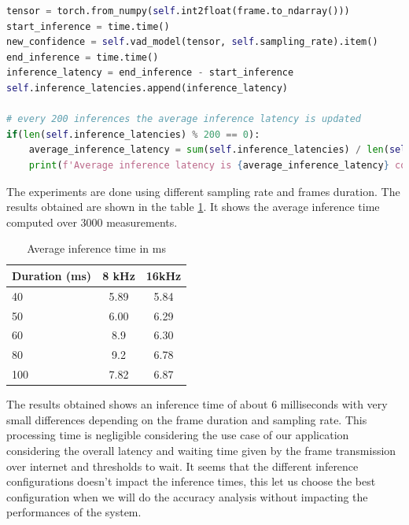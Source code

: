 \documentclass[../main.tex]{subfiles}
\begin{document}
\begin{lstlisting}[language=Python, caption={Model's inference latency}]
tensor = torch.from_numpy(self.int2float(frame.to_ndarray()))
start_inference = time.time()
new_confidence = self.vad_model(tensor, self.sampling_rate).item()
end_inference = time.time()
inference_latency = end_inference - start_inference
self.inference_latencies.append(inference_latency)
            
# every 200 inferences the average inference latency is updated
if(len(self.inference_latencies) % 200 == 0):
    average_inference_latency = sum(self.inference_latencies) / len(self.inference_latencies)
    print(f'Average inference latency is {average_inference_latency} computed over {len(self.inference_latencies)} measurements')
\end{lstlisting}
\label{listing:inference latency}

The experiments are done using different sampling rate and frames duration. The results obtained are shown in the table \ref{tab:inference time}. It shows the average inference time computed over 3000 measurements.

\begin{table}[ht]
    \centering
    \begin{tabular}{|l|c|c|} \hline 
         Duration (ms)& 8 kHz &16kHz\\ \hline 
         40&  5.89&5.84\\ \hline 
         50&  6.00&6.29\\ \hline 
         60&  8.9&6.30\\ \hline 
         80&  9.2&6.78\\ \hline 
         100&  7.82&6.87\\ \hline
    \end{tabular}
    \caption{Average inference time in ms}
    \label{tab:inference time}
\end{table}

The results obtained shows an inference time of about 6 milliseconds with very small differences depending on the frame duration and sampling rate. This processing time is negligible considering the use case of our application considering the overall latency and waiting time given by the frame transmission over internet and thresholds to wait. It seems that the different inference configurations doesn't impact the inference times, this let us choose the best configuration when we will do the accuracy analysis without impacting the performances of the system.
\end{document}
